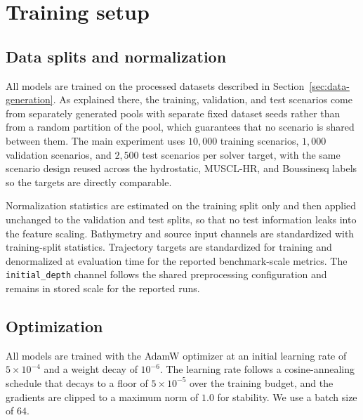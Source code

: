 \section{Training setup}
\label{sec:training}

\subsection{Data splits and normalization}
\label{subsec:train-splits}
All models are trained on the processed datasets described in Section~\ref{sec:data-generation}. As explained there, the training, validation, and test scenarios come from separately generated pools with separate fixed dataset seeds rather than from a random partition of the pool, which guarantees that no scenario is shared between them. The main experiment uses $10{,}000$ training scenarios, $1{,}000$ validation scenarios, and $2{,}500$ test scenarios per solver target, with the same scenario design reused across the hydrostatic, MUSCL-HR, and Boussinesq labels so the targets are directly comparable.

Normalization statistics are estimated on the training split only and then applied unchanged to the validation and test splits, so that no test information leaks into the feature scaling. Bathymetry and source input channels are standardized with training-split statistics. Trajectory targets are standardized for training and denormalized at evaluation time for the reported benchmark-scale metrics. The \texttt{initial\_depth} channel follows the shared preprocessing configuration and remains in stored scale for the reported runs.

\subsection{Optimization}
\label{subsec:train-optim}
All models are trained with the AdamW optimizer at an initial learning rate of $5 \times 10 ^ {-4}$ and a weight decay of $10 ^ {-6}$. The learning rate follows a cosine-annealing schedule that decays to a floor of $5 \times 10 ^ {-5}$ over the training budget, and the gradients are clipped to a maximum norm of $1.0$ for stability. We use a batch size of $64$.

